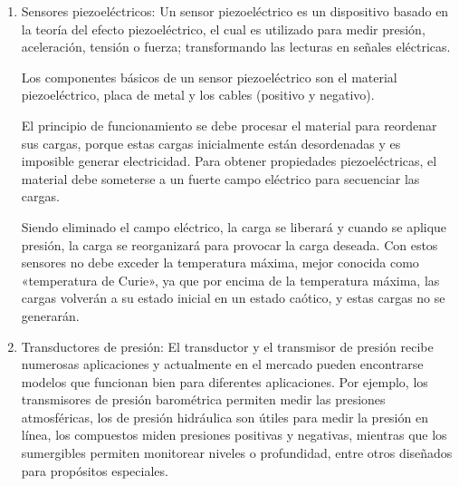 \begin{enumerate}
\begin{enumerate}
			\begin{figure}[h]
				\centering
				\hfill
			\end{figure}
			
			\item Sensores piezoeléctricos: Un sensor piezoeléctrico es un dispositivo basado en la teoría del efecto piezoeléctrico, el cual es utilizado para medir presión, aceleración, tensión o fuerza; transformando las lecturas en señales eléctricas.
			
			Los componentes básicos de un sensor piezoeléctrico son el material piezoeléctrico, placa de metal y los cables (positivo y negativo).
			
			El principio de funcionamiento se debe procesar el material para reordenar sus cargas, porque estas cargas inicialmente están desordenadas y es imposible generar electricidad. Para obtener propiedades piezoeléctricas, el material debe someterse a un fuerte campo eléctrico para secuenciar las cargas.
			
			Siendo eliminado el campo eléctrico, la carga se liberará y cuando se aplique presión, la carga se reorganizará para provocar la carga deseada. Con estos sensores no debe exceder la temperatura máxima, mejor conocida como «temperatura de Curie», ya que por encima de la temperatura máxima, las cargas volverán a su estado inicial en un estado caótico, y estas cargas no se generarán. \cite{SensoresPiezoelectricos} \\
			
					\begin{figure}[h]
					\centering
					\hfill
				\end{figure}
			
			\item Transductores de presión: El transductor y el transmisor de presión recibe numerosas aplicaciones y actualmente en el mercado pueden encontrarse modelos que funcionan bien para diferentes aplicaciones. Por ejemplo, los transmisores de presión barométrica permiten medir las presiones atmosféricas, los de presión hidráulica son útiles para medir la presión en línea, los compuestos miden presiones positivas y negativas, mientras que los sumergibles permiten monitorear niveles o profundidad, entre otros diseñados para propósitos especiales. \cite{TransductorPresión} \\
			

\end{enumerate}
\end{enumerate}
